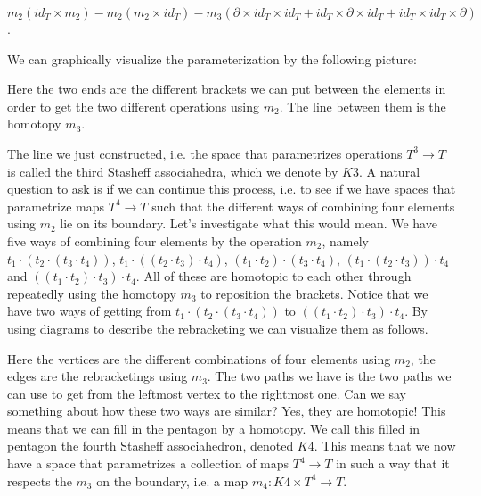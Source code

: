 $ m_2(id_T\times m_2) - m_2(m_2 \times id_T) - m_3(\partial \times id_T \times id_T + id_T\times \partial \times id_T + id_T\times id_T\times \partial )$.

We can graphically visualize the parameterization by the following picture:

\begin{center}
\def\svgwidth{0.6\textwidth}

\end{center}


Here the two ends are the different brackets we can put between the elements in order to get the two different operations using $ m_2$. The line between them is the homotopy $m_3$.

The line we just constructed, i.e. the space that parametrizes operations $ T^3\longrightarrow T$ is called the third Stasheff associahedra, which we denote by $K3$. A natural question to ask is if we can continue this process, i.e. to see if we have spaces that parametrize maps $T^4\longrightarrow T$ such that the different ways of combining four elements using $m_2$ lie on its boundary. Let's investigate what this would mean. We have five ways of combining four elements by the operation $ m_2$, namely $ t_1 \cdot (t_2 \cdot (t_3 \cdot t_4))$, $ t_1 \cdot ((t_2 \cdot t_3) \cdot t_4)$, $ (t_1 \cdot t_2) \cdot (t_3 \cdot t_4)$, $ (t_1 \cdot (t_2 \cdot t_3)) \cdot t_4$ and $ ((t_1 \cdot t_2) \cdot t_3) \cdot t_4$. All of these are homotopic to each other through repeatedly using the homotopy $m_3$ to reposition the brackets. Notice that we have two ways of getting from $ t_1 \cdot (t_2 \cdot (t_3 \cdot t_4))$ to $ ((t_1 \cdot t_2) \cdot t_3) \cdot t_4$. By using diagrams to describe the rebracketing we can visualize them as follows.

\begin{center}
\def\svgwidth{0.6\textwidth}

\end{center}

Here the vertices are the different combinations of four elements using $ m_2$, the edges are the rebracketings using $ m_3$. The two paths we have is the two paths we can use to get from the leftmost vertex to the rightmost one. Can we say something about how these two ways are similar? Yes, they are homotopic! This means that we can fill in the pentagon by a homotopy. We call this filled in pentagon the fourth Stasheff associahedron, denoted $ K4$. This means that we now have a space that parametrizes a collection of maps $ T^4\longrightarrow T$ in such a way that it respects the $ m_3$ on the boundary, i.e. a map $ m_4: K4\times T^4\longrightarrow T$.


